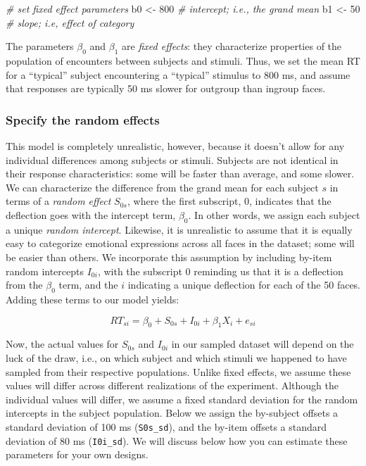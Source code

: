 \documentclass[doc,floatsintext]{apa6}
\newenvironment{Shaded}{\begin{snugshade}}{\end{snugshade}}
\newcommand{\DecValTok}[1]{\textcolor[rgb]{0.00,0.00,0.81}{#1}}
\newcommand{\StringTok}[1]{\textcolor[rgb]{0.31,0.60,0.02}{#1}}
\newcommand{\CommentTok}[1]{\textcolor[rgb]{0.56,0.35,0.01}{\textit{#1}}}
\newcommand{\NormalTok}[1]{#1}
\begin{document}
\begin{Shaded}
\begin{Highlighting}[]
\CommentTok{# set fixed effect parameters}
\NormalTok{b0 <-}\StringTok{ }\DecValTok{800} \CommentTok{# intercept; i.e., the grand mean}
\NormalTok{b1 <-}\StringTok{  }\DecValTok{50} \CommentTok{# slope; i.e, effect of category}
\end{Highlighting}
\end{Shaded}

\noindent The parameters \(\beta_0\) and \(\beta_1\) are \emph{fixed
effects}: they characterize properties of the population of encounters
between subjects and stimuli. Thus, we set the mean RT for a
\enquote{typical} subject encountering a \enquote{typical} stimulus to
800 ms, and assume that responses are typically 50 ms slower for
outgroup than ingroup faces.

\subsubsection{Specify the random
effects}\label{specify-the-random-effects}

This model is completely unrealistic, however, because it doesn't allow
for any individual differences among subjects or stimuli. Subjects are
not identical in their response characteristics: some will be faster
than average, and some slower. We can characterize the difference from
the grand mean for each subject \(s\) in terms of a \emph{random effect}
\(S_{0s}\), where the first subscript, 0, indicates that the deflection
goes with the intercept term, \(\beta_0\). In other words, we assign
each subject a unique \emph{random intercept}. Likewise, it is
unrealistic to assume that it is equally easy to categorize emotional
expressions across all faces in the dataset; some will be easier than
others. We incorporate this assumption by including by-item random
intercepts \(I_{0i}\), with the subscript 0 reminding us that it is a
deflection from the \(\beta_0\) term, and the \(i\) indicating a unique
deflection for each of the 50 faces. Adding these terms to our model
yields:

\begin{equation}
RT_{si} = \beta_0 + S_{0s} + I_{0i} + \beta_1 X_i + e_{si}
\end{equation}

Now, the actual values for \(S_{0s}\) and \(I_{0i}\) in our sampled
dataset will depend on the luck of the draw, i.e., on which subject and
which stimuli we happened to have sampled from their respective
populations. Unlike fixed effects, we assume these values will differ
across different realizations of the experiment. Although the individual
values will differ, we assume a fixed standard deviation for the random
intercepts in the subject population. Below we assign the by-subject
offsets a standard deviation of 100 ms (\texttt{S0s\_sd}), and the
by-item offsets a standard deviation of 80 ms (\texttt{I0i\_sd}). We
will discuss below how you can estimate these parameters for your own
designs.
\end{document}
